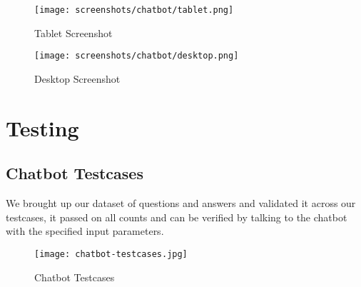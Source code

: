 \vspace*{\fill}
\begin{figure}[H]
    \centering
    \texttt{[image: screenshots/chatbot/tablet.png]}
    \caption{Tablet Screenshot}
\end{figure}

\begin{figure}[H]
    \centering
    \texttt{[image: screenshots/chatbot/desktop.png]}
    \caption{Desktop Screenshot}
\end{figure}
\vspace*{\fill}

\pagebreak

\section{Testing}

\subsection{Chatbot Testcases}

\noindent
We brought up our dataset of questions and answers and validated it across our testcases, it passed on all counts and can be verified by talking to the chatbot with the specified input parameters.

\begin{figure}[H]
    \centering
    \texttt{[image: chatbot-testcases.jpg]}
    \caption{Chatbot Testcases}
\end{figure}